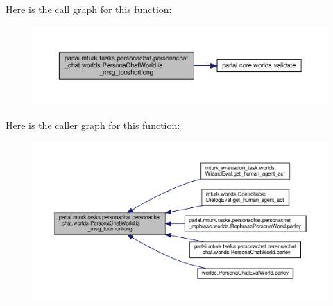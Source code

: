 Here is the call graph for this function\+:
\nopagebreak
\begin{figure}[H]
\begin{center}
\leavevmode
\includegraphics[width=350pt]{classparlai_1_1mturk_1_1tasks_1_1personachat_1_1personachat__chat_1_1worlds_1_1PersonaChatWorld_a7f6c59f2e1f897e1e480b43fc67680df_cgraph}
\end{center}
\end{figure}
Here is the caller graph for this function\+:
\nopagebreak
\begin{figure}[H]
\begin{center}
\leavevmode
\includegraphics[width=350pt]{classparlai_1_1mturk_1_1tasks_1_1personachat_1_1personachat__chat_1_1worlds_1_1PersonaChatWorld_a7f6c59f2e1f897e1e480b43fc67680df_icgraph}
\end{center}
\end{figure}
\mbox{\label{classparlai_1_1mturk_1_1tasks_1_1personachat_1_1personachat__chat_1_1worlds_1_1PersonaChatWorld_af1504dbfbf076f8e3dad5f8ac823f761}} 
